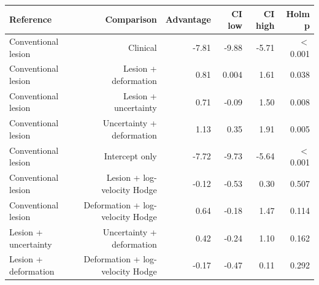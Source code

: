 \begin{tabular}{lrrrrr}
\toprule
Reference & Comparison & Advantage & CI low & CI high & Holm p \\
\midrule
Conventional lesion & Clinical & -7.81 & -9.88 & -5.71 & $<$0.001 \\
Conventional lesion & Lesion + deformation & 0.81 & 0.004 & 1.61 & 0.038 \\
Conventional lesion & Lesion + uncertainty & 0.71 & -0.09 & 1.50 & 0.008 \\
Conventional lesion & Uncertainty + deformation & 1.13 & 0.35 & 1.91 & 0.005 \\
Conventional lesion & Intercept only & -7.72 & -9.73 & -5.64 & $<$0.001 \\
Conventional lesion & Lesion + log-velocity Hodge & -0.12 & -0.53 & 0.30 & 0.507 \\
Conventional lesion & Deformation + log-velocity Hodge & 0.64 & -0.18 & 1.47 & 0.114 \\
Lesion + uncertainty & Uncertainty + deformation & 0.42 & -0.24 & 1.10 & 0.162 \\
Lesion + deformation & Deformation + log-velocity Hodge & -0.17 & -0.47 & 0.11 & 0.292 \\
\bottomrule
\end{tabular}
